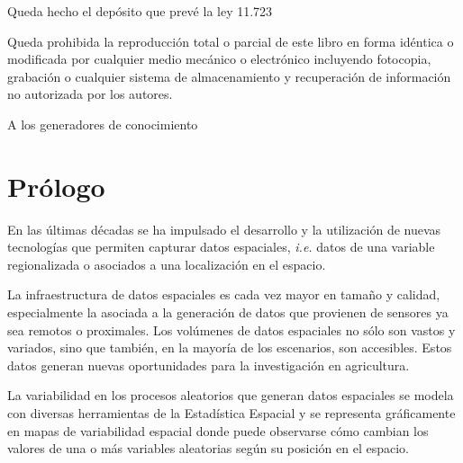 \documentclass[11pt,b5paper,]{krantz}
\begin{document}
Queda hecho el depósito que prevé la ley 11.723



\bigskip
\small{
Queda prohibida la reproducción total o parcial de este libro en forma idéntica o modificada por cualquier medio mecánico o electrónico incluyendo fotocopia, grabación o cualquier sistema de almacenamiento y recuperación de información no autorizada por los autores.
}

\newpage

\hfill	\large{ A los generadores de conocimiento} 


\setlength{\abovedisplayskip}{-3pt}
\setlength{\abovedisplayshortskip}{-3pt}

{
\hypersetup{linkcolor=}
\setcounter{tocdepth}{2}
\tableofcontents
}
\hypertarget{pruxf3logo}{%
\chapter*{Prólogo}\label{pruxf3logo}}


En las últimas décadas se ha impulsado el desarrollo y la utilización de nuevas tecnologías que permiten capturar datos espaciales, \emph{i.e.} datos de una variable regionalizada o asociados a una localización en el espacio.

La infraestructura de datos espaciales es cada vez mayor en tamaño y calidad, especialmente la asociada a la generación de datos que provienen de sensores ya sea remotos o proximales. Los volúmenes de datos espaciales no sólo son vastos y variados, sino que también, en la mayoría de los escenarios, son accesibles. Estos datos generan nuevas oportunidades para la investigación en agricultura.

La variabilidad en los procesos aleatorios que generan datos espaciales se modela con diversas herramientas de la Estadística Espacial y se representa gráficamente en mapas de variabilidad espacial donde puede observarse cómo cambian los valores de una o más variables aleatorias según su posición en el espacio.
\end{document}
